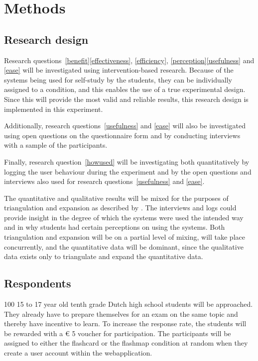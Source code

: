 \chapter{Methods}
\label{ch:methods}

\section{Research design}
\label{sec:researchdesign}

Research questions~\ref{benefit}\ref{effectiveness}, \ref{efficiency}, \ref{perception}\ref{usefulness} and \ref{ease} will be investigated using intervention-based research. Because of the systems being used for self-study by the students, they can be individually assigned to a condition, and this enables the use of a true experimental design. Since this will provide the most valid and reliable results, this research design is implemented in this experiment.

Additionally, research questions~\ref{usefulness} and \ref{ease} will also be investigated using open questions on the questionnaire form and by conducting interviews with a sample of the participants.

Finally, research question~\ref{howused} will be investigating both quantitatively by logging the user behaviour during the experiment and by the open questions and interviews also used for research questions~\ref{usefulness} and \ref{ease}.

The quantitative and qualitative results will be mixed for the purposes of triangulation and expansion as described by . The interviews and logs could provide insight in the degree of which the systems were used the intended way and in why students had certain perceptions on using the systems. Both triangulation and expansion will be on a partial level of mixing, will take place concurrently, and the quantitative data will be dominant, since the qualitative data exists only to triangulate and expand the quantitative data. 

\section{Respondents}
\label{sec:respondents}

100 15 to 17 year old tenth grade Dutch high school students will be approached. They already have to prepare themselves for an exam on the same topic and thereby have incentive to learn. To increase the response rate, the students will be rewarded with a \euro{} 5 voucher for participation. The participants will be assigned to either the flashcard or the flashmap condition at random when they create a user account within the webapplication.

